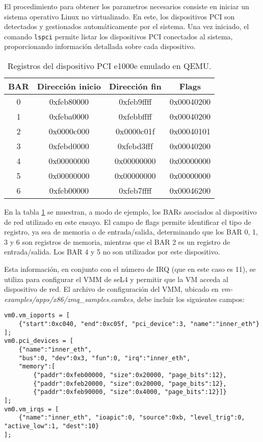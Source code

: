 El procedimiento para obtener los parametros necesarios consiste en iniciar un sistema operativo Linux no virtualizado. En este, los dispositivos PCI son detectados y gestionados automáticamente por el sistema. Una vez iniciado, el comando \texttt{lspci} permite listar los dispositivos PCI conectados al sistema, proporcionando información detallada sobre cada dispositivo.

\begin{table}[h!]
\centering
\begin{tabular}{|c|c|c|c|}
\hline
\textbf{BAR} & \textbf{Dirección inicio} & \textbf{Dirección fin} & \textbf{Flags} \\
\hline
0 & 0xfeb80000 & 0xfeb9ffff & 0x00040200 \\
1 & 0xfeba0000 & 0xfebbffff & 0x00040200 \\
2 & 0x0000c000 & 0x0000c01f & 0x00040101 \\
3 & 0xfebd0000 & 0xfebd3fff & 0x00040200 \\
4 & 0x00000000 & 0x00000000 & 0x00000000 \\
5 & 0x00000000 & 0x00000000 & 0x00000000 \\
6 & 0xfeb00000 & 0xfeb7ffff & 0x00046200 \\
\hline
\end{tabular}
\caption{Registros del dispositivo PCI e1000e emulado en QEMU.}
\label{tab:bar-pci}
\end{table}

 En la tabla \ref{tab:bar-pci} se muestran, a modo de ejemplo, los BARs asociados al dispositivo de red utilizado en este ensayo. El campo de flags permite identificar el tipo de registro, ya sea de memoria o de entrada/salida, determinando que los BAR 0, 1, 3 y 6 son registros de memoria, mientras que el BAR 2 es un registro de entrada/salida. Los BAR 4 y 5 no son utilizados por este dispositivo. 

Esta información, en conjunto con el número de IRQ (que en este caso es 11), se utiliza para configurar el VMM de seL4 y permitir que la VM acceda al dispositivo de red. El archivo de configuración del VMM, ubicado en \textit{vm-examples/apps/x86/zmq\_samples.camkes}, debe incluir los siguientes campos:

\begin{lstlisting}[caption={Configuración CAmkES para el passthrough del dispositivo de red e1000e.}, label={lst:zmq_samples_passthrough}]
vm0.vm_ioports = [
    {"start":0xc040, "end":0xc05f, "pci_device":3, "name":"inner_eth"}
];
vm0.pci_devices = [
    {"name":"inner_eth",
    "bus":0, "dev":0x3, "fun":0, "irq":"inner_eth",
    "memory":[
        {"paddr":0xfeb00000, "size":0x20000, "page_bits":12},
        {"paddr":0xfeb20000, "size":0x20000, "page_bits":12},
        {"paddr":0xfeb90000, "size":0x4000, "page_bits":12}]}
];
vm0.vm_irqs = [
    {"name":"inner_eth", "ioapic":0, "source":0xb, "level_trig":0, "active_low":1, "dest":10}
];
\end{lstlisting}

